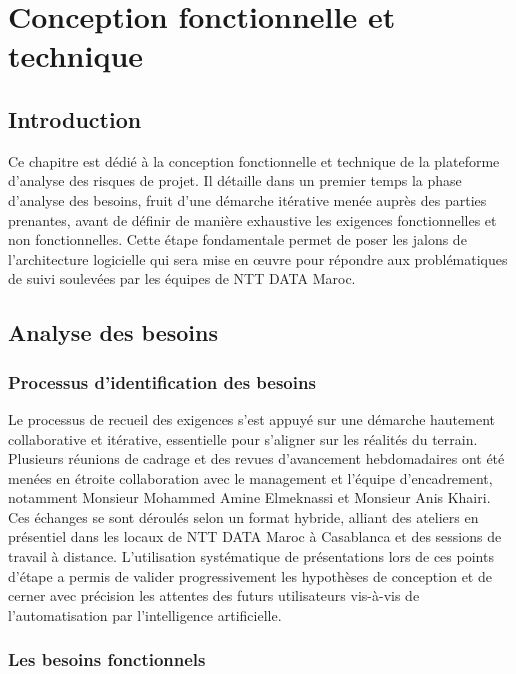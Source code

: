 \chapter{Conception fonctionnelle et technique}
\vspace{-1.5em}
\chaptertoc
\vspace{-2.5em}
\section{Introduction}
Ce chapitre est dédié à la conception fonctionnelle et technique de la plateforme d'analyse des risques de projet. Il détaille dans un premier temps la phase d'analyse des besoins, fruit d'une démarche itérative menée auprès des parties prenantes, avant de définir de manière exhaustive les exigences fonctionnelles et non fonctionnelles. Cette étape fondamentale permet de poser les jalons de l'architecture logicielle qui sera mise en œuvre pour répondre aux problématiques de suivi soulevées par les équipes de NTT DATA Maroc.

\section{Analyse des besoins}

\subsection{Processus d'identification des besoins}
Le processus de recueil des exigences s'est appuyé sur une démarche hautement collaborative et itérative, essentielle pour s'aligner sur les réalités du terrain. Plusieurs réunions de cadrage et des revues d'avancement hebdomadaires ont été menées en étroite collaboration avec le management et l'équipe d'encadrement, notamment Monsieur Mohammed Amine Elmeknassi et Monsieur Anis Khairi. Ces échanges se sont déroulés selon un format hybride, alliant des ateliers en présentiel dans les locaux de NTT DATA Maroc à Casablanca et des sessions de travail à distance. L'utilisation systématique de présentations lors de ces points d'étape a permis de valider progressivement les hypothèses de conception et de cerner avec précision les attentes des futurs utilisateurs vis-à-vis de l'automatisation par l'intelligence artificielle.

\subsection{Les besoins fonctionnels}

